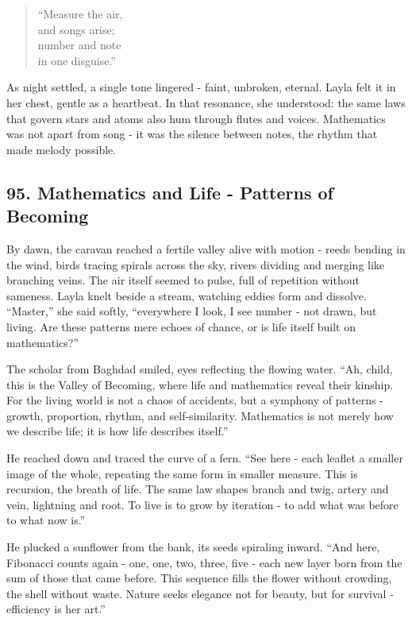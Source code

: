 \documentclass[
  letterpaper,
  DIV=11,
  numbers=noendperiod]{scrreprt}
\begin{document}
\begin{quote}
``Measure the air,\\
and songs arise;\\
number and note\\
in one disguise.''
\end{quote}

As night settled, a single tone lingered - faint, unbroken, eternal.
Layla felt it in her chest, gentle as a heartbeat. In that resonance,
she understood: the same laws that govern stars and atoms also hum
through flutes and voices. Mathematics was not apart from song - it was
the silence between notes, the rhythm that made melody possible.

\subsection{95. Mathematics and Life - Patterns of
Becoming}\label{mathematics-and-life---patterns-of-becoming}

By dawn, the caravan reached a fertile valley alive with motion - reeds
bending in the wind, birds tracing spirals across the sky, rivers
dividing and merging like branching veins. The air itself seemed to
pulse, full of repetition without sameness. Layla knelt beside a stream,
watching eddies form and dissolve. ``Master,'' she said softly,
``everywhere I look, I see number - not drawn, but living. Are these
patterns mere echoes of chance, or is life itself built on
mathematics?''

The scholar from Baghdad smiled, eyes reflecting the flowing water.
``Ah, child, this is the Valley of Becoming, where life and mathematics
reveal their kinship. For the living world is not a chaos of accidents,
but a symphony of patterns - growth, proportion, rhythm, and
self-similarity. Mathematics is not merely how we describe life; it is
how life describes itself.''

He reached down and traced the curve of a fern. ``See here - each
leaflet a smaller image of the whole, repeating the same form in smaller
measure. This is recursion, the breath of life. The same law shapes
branch and twig, artery and vein, lightning and root. To live is to grow
by iteration - to add what was before to what now is.''

He plucked a sunflower from the bank, its seeds spiraling inward. ``And
here, Fibonacci counts again - one, one, two, three, five - each new
layer born from the sum of those that came before. This sequence fills
the flower without crowding, the shell without waste. Nature seeks
elegance not for beauty, but for survival - efficiency is her art.''
\end{document}
